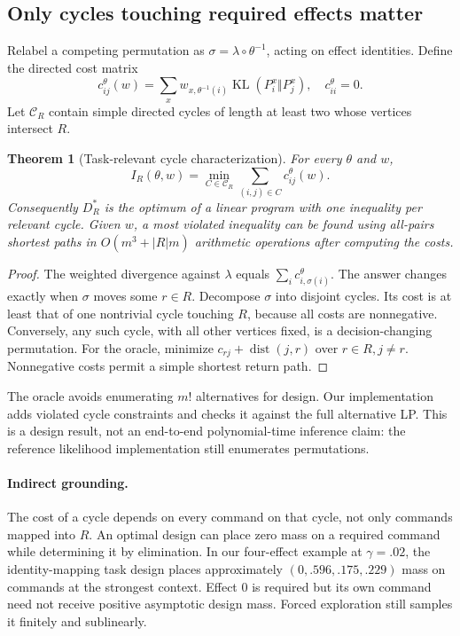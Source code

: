 \documentclass{article}
\newtheorem{theorem}{Theorem}
\newcommand{\KL}{\operatorname{KL}}
\begin{document}
\subsection{Only cycles touching required effects matter}
Relabel a competing permutation as $\sigma=\lambda\circ\theta^{-1}$, acting on effect identities. Define the directed cost matrix
\begin{equation}
c_{ij}^{\theta}(w)=\sum_xw_{x,\theta^{-1}(i)}\KL(P_i^x\Vert P_j^x),\quad c_{ii}^{\theta}=0. \label{eq:cost}
\end{equation}
Let $\mathcal C_R$ contain simple directed cycles of length at least two whose vertices intersect $R$.
\begin{theorem}[Task-relevant cycle characterization]\label{thm:cycles}
For every $\theta$ and $w$,
\begin{equation}
I_R(\theta,w)=\min_{C\in\mathcal C_R}\sum_{(i,j)\in C}c_{ij}^{\theta}(w). \label{eq:cycles}
\end{equation}
Consequently $D_R^*$ is the optimum of a linear program with one inequality per relevant cycle. Given $w$, a most violated inequality can be found using all-pairs shortest paths in $O(m^3+|R|m)$ arithmetic operations after computing the costs.
\end{theorem}
\begin{proof}
The weighted divergence against $\lambda$ equals $\sum_i c_{i,\sigma(i)}^{\theta}$. The answer changes exactly when $\sigma$ moves some $r\in R$. Decompose $\sigma$ into disjoint cycles. Its cost is at least that of one nontrivial cycle touching $R$, because all costs are nonnegative. Conversely, any such cycle, with all other vertices fixed, is a decision-changing permutation. For the oracle, minimize $c_{rj}+\operatorname{dist}(j,r)$ over $r\in R,j\ne r$. Nonnegative costs permit a simple shortest return path.
\end{proof}
The oracle avoids enumerating $m!$ alternatives for design. Our implementation adds violated cycle constraints and checks it against the full alternative LP. This is a design result, not an end-to-end polynomial-time inference claim: the reference likelihood implementation still enumerates permutations.

\paragraph{Indirect grounding.}
The cost of a cycle depends on every command on that cycle, not only commands mapped into $R$. An optimal design can place zero mass on a required command while determining it by elimination. In our four-effect example at $\gamma=.02$, the identity-mapping task design places approximately $(0,.596,.175,.229)$ mass on commands at the strongest context. Effect $0$ is required but its own command need not receive positive asymptotic design mass. Forced exploration still samples it finitely and sublinearly.
\end{document}
